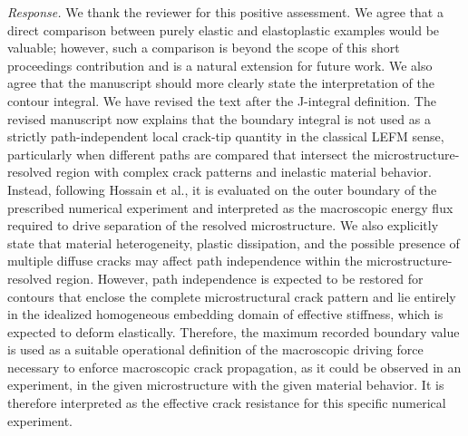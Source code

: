 \documentclass[a4paper,11pt]{article}
\begin{document}
\emph{Response.} We thank the reviewer for this positive assessment.
We agree that a direct comparison between purely elastic and
elastoplastic examples would be valuable; however, such a comparison
is beyond the scope of this short proceedings contribution and is a
natural extension for future work. We also agree that the manuscript
should more clearly
state the interpretation of the contour integral. We have revised the
text after the J-integral definition. The revised manuscript now
explains that the boundary integral is not used as a strictly
path-independent local crack-tip quantity in the classical LEFM
sense, particularly when different paths are compared that intersect
the microstructure-resolved region with complex crack patterns and
inelastic material behavior. Instead, following Hossain et al., it is evaluated on the
outer boundary of the prescribed numerical experiment and interpreted
as the macroscopic energy flux required to drive separation of the
resolved microstructure. We also explicitly state that material
heterogeneity, plastic dissipation, and the possible presence of
multiple diffuse cracks may affect path independence within the
microstructure-resolved region. However, path independence is
expected to be restored for contours that enclose the complete
microstructural crack pattern and lie entirely in the idealized
homogeneous embedding domain of effective stiffness, which is
expected to deform elastically. Therefore, the maximum recorded
boundary value is used as a suitable operational definition of the
macroscopic driving force necessary to enforce macroscopic crack
propagation, as it could be observed in an experiment, in the given
microstructure with the given material behavior. It is therefore
interpreted as the effective crack resistance for this specific
numerical experiment.
\end{document}
